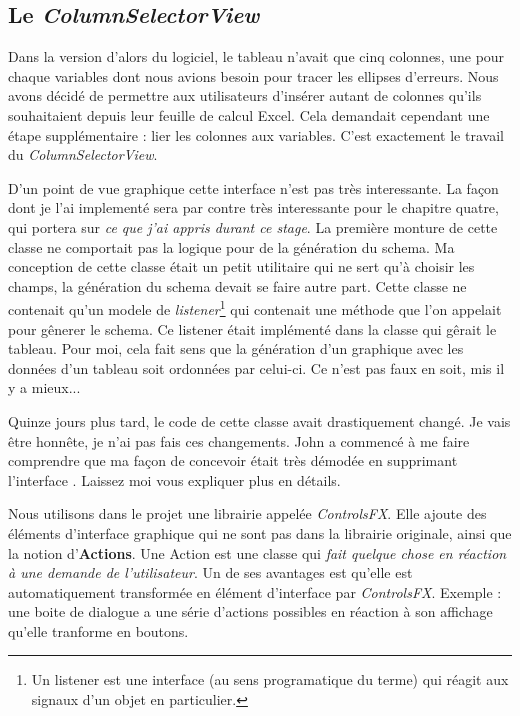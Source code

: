 \subsection{Le \textit{ColumnSelectorView}}
Dans la version d'alors du logiciel, le tableau n'avait que cinq colonnes, une pour chaque variables dont nous avions besoin pour tracer les ellipses d'erreurs. Nous avons décidé de permettre aux utilisateurs d'insérer autant de colonnes qu'ils souhaitaient depuis leur feuille de calcul Excel. Cela demandait cependant une étape supplémentaire : lier les colonnes aux variables. C'est exactement le travail du \textit{ColumnSelectorView}. 


D'un point de vue graphique cette interface n'est pas très interessante. La façon dont je l'ai implementé sera par contre très interessante pour le chapitre quatre, qui portera sur \textit{ce que j'ai appris durant ce stage}. La première monture de cette classe ne comportait pas la logique pour de la génération du schema. Ma conception de cette classe était un petit utilitaire qui ne sert qu'à choisir les champs, la génération du schema devait se faire autre part. Cette classe ne contenait qu'un modele de \textit{listener}\footnote{Un listener est une interface (au sens programatique du terme) qui réagit aux signaux d'un objet en particulier.} qui contenait une méthode que l'on appelait pour gênerer le schema. Ce listener était implémenté dans la classe qui gêrait le tableau. Pour moi, cela fait sens que la génération d'un graphique avec les données d'un tableau soit ordonnées par celui-ci. Ce n'est pas faux en soit, mis il y a mieux...


Quinze jours plus tard, le code de cette classe avait drastiquement changé. Je vais être honnête, je n'ai pas fais ces changements. John a commencé à me faire comprendre que ma façon de concevoir était très démodée en supprimant l'interface %
. Laissez moi vous expliquer plus en détails.

Nous utilisons dans le projet une librairie appelée \textit{ControlsFX}. Elle ajoute des éléments d'interface graphique qui ne sont pas dans la librairie originale, ainsi que la notion d'\textbf{Actions}. Une Action est une classe qui \textit{fait quelque chose en réaction à une demande de l'utilisateur}. Un de ses avantages est qu'elle est automatiquement transformée en élément d'interface par \textit{ControlsFX}. Exemple : une boite de dialogue a une série d'actions possibles en réaction à son affichage qu'elle tranforme en boutons.

